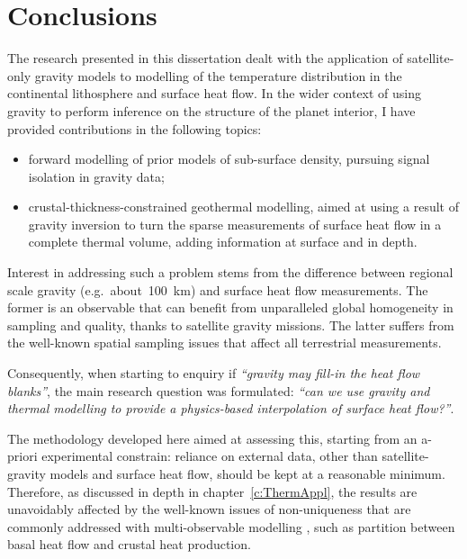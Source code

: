 \chapter{Conclusions}
\label{c:Conclusions}

The research presented in this dissertation dealt with the application of satellite-only gravity models to modelling of the temperature distribution in the continental lithosphere and surface heat flow.
In the wider context of using gravity to perform inference on the structure of the planet interior, I have provided contributions in the following topics:
\begin{itemize}
    \item forward modelling of prior models of sub-surface density, pursuing signal isolation in gravity data;
    \item crustal-thickness-constrained geothermal modelling, aimed at using a result of gravity inversion to turn the sparse measurements of surface heat flow in a complete thermal volume, adding information at surface and in depth.
\end{itemize}

Interest in addressing such a problem stems from the difference between regional scale gravity (e.g.~about~\SI{100}{\kilo \metre}) and surface heat flow measurements.
The former is an observable that can benefit from unparalleled global homogeneity in sampling and quality, thanks to satellite gravity missions.
The latter suffers from the well-known spatial sampling issues that affect all terrestrial measurements.

Consequently, when starting to enquiry if \emph{``gravity may fill-in the heat flow blanks''}, the main research question was formulated: \emph{``can we use gravity and thermal modelling to provide a physics-based interpolation of surface heat flow?''}.

The methodology developed here aimed at assessing this, starting from an a-priori experimental constrain: reliance on external data, other than satellite-gravity models and surface heat flow, should be kept at a reasonable minimum.
Therefore, as discussed in depth in chapter~\ref{c:ThermAppl}, the results are unavoidably affected by the well-known issues of non-uniqueness that are commonly addressed with multi-observable modelling \parencite{Afonso2013multiobsI}, such as partition between basal heat flow and crustal heat production.

